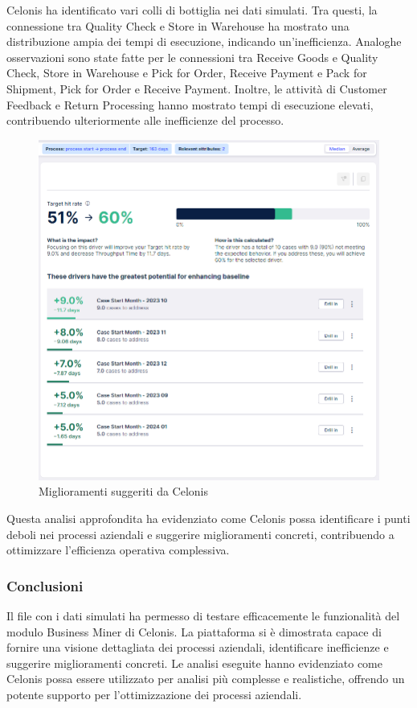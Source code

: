 \documentclass{article}
\begin{document}
Celonis ha identificato vari colli di bottiglia nei dati simulati. Tra questi, la connessione tra Quality Check e Store in Warehouse ha mostrato una distribuzione ampia dei tempi di esecuzione, indicando un'inefficienza. Analoghe osservazioni sono state fatte per le connessioni tra Receive Goods e Quality Check, Store in Warehouse e Pick for Order, Receive Payment e Pack for Shipment, Pick for Order e Receive Payment. Inoltre, le attività di Customer Feedback e Return Processing hanno mostrato tempi di esecuzione elevati, contribuendo ulteriormente alle inefficienze del processo.\\
\begin{figure}[H]
    \centering
    \includegraphics[width=\textwidth]{imgCelonis/PrimaSimulazione/MiglioramentiSuggeriti.png}
    \caption{Miglioramenti suggeriti da Celonis}
    \label{fig:Miglioramenti-suggeriti}
\end{figure}
Questa analisi approfondita ha evidenziato come Celonis possa identificare i punti deboli nei processi aziendali e suggerire miglioramenti concreti, contribuendo a ottimizzare l'efficienza operativa complessiva.
\subsubsection{Conclusioni}
Il file con i dati simulati ha permesso di testare efficacemente le funzionalità del modulo Business Miner di Celonis. La piattaforma si è dimostrata capace di fornire una visione dettagliata dei processi aziendali, identificare inefficienze e suggerire miglioramenti concreti. Le analisi eseguite hanno evidenziato come Celonis possa essere utilizzato per analisi più complesse e realistiche, offrendo un potente supporto per l'ottimizzazione dei processi aziendali.
\end{document}
